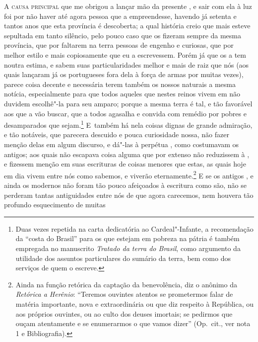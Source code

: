 \noindent\textsc{A causa principal} que me obrigou a lançar mão da presente , e
sair com ela à luz foi por não haver até agora pessoa que a empreendesse,
havendo já setenta e tantos anos que esta província é descoberta; a
qual história creio que mais esteve sepultada em tanto silêncio, pelo
pouco caso que os  fizeram sempre da mesma província, que
por faltarem na terra pessoas de engenho e curiosas, que por melhor			%
estilo e mais copiosamente que eu a escrevessem. Porém já que os
 a tem noutra estima, e sabem suas particularidades melhor
e mais de raiz que nós (aos quais lançaram já os portugueses fora dela
à força de armas por muitas vezes), parece coisa decente e necessária
terem também os nossos naturais a mesma notícia, especialmente para que			
todos aqueles que nestes reinos vivem em  não duvidem escolhê"-la
para seu amparo; porque a mesma terra é tal, e tão favorável aos que a
vão buscar, que a todos agasalha e convida com remédio por pobres e
desamparados que sejam.\footnote{ Duas vezes repetida na carta
dedicatória ao Cardeal"-Infante, a recomendação da ``costa
do Brasil'' para os  que estejam em pobreza na
pátria é também empregada no manuscrito \textit{Tratado da terra do Brasil},
como argumento da utilidade dos assuntos particulares do sumário da
terra, bem como dos serviços de quem o escreve.} \mbox{E também} há nela
coisas dignas de grande admiração, e tão notáveis, que parecera
descuido e pouca curiosidade nossa, não fazer menção delas em algum
discurso, e dá"-las à perpétua , como costumavam os antigos; aos
quais não escapava coisa alguma que por extenso não reduzissem à , 
e fizessem menção em suas escrituras de coisas menores que
estas, as quais hoje em dia vivem entre nós como sabemos, e viverão
eternamente.\footnote{ Ainda na função retórica da captação da
benevolência, diz o anônimo da \textit{Retórica a Herênio}:
``Teremos ouvintes atentos se prometermos falar de matéria
importante, nova e extraordinária ou que diz respeito à República, ou
aos próprios ouvintes, ou ao culto dos deuses imortais; se pedirmos que
ouçam atentamente e se enumerarmos o que vamos dizer'' 
(Op.~cit., ver nota 1 e Bibliografia).} E se os antigos
, e ainda os modernos não foram tão pouco afeiçoados à
escritura como são, não se perderam tantas antiguidades entre nós de		%
que agora carecemos, nem houvera tão profundo esquecimento de muitas
